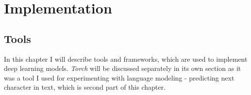 %
%
%
%

\chapter{Implementation}

	\section{Tools}\label{chp:exper}

In this chapter I will describe tools and frameworks, which are used to implement deep learning models. \emph{Torch} will be discussed separately in its own section as it was a tool I used for experimenting with language modeling - predicting next character in text, which is second part of this chapter.


